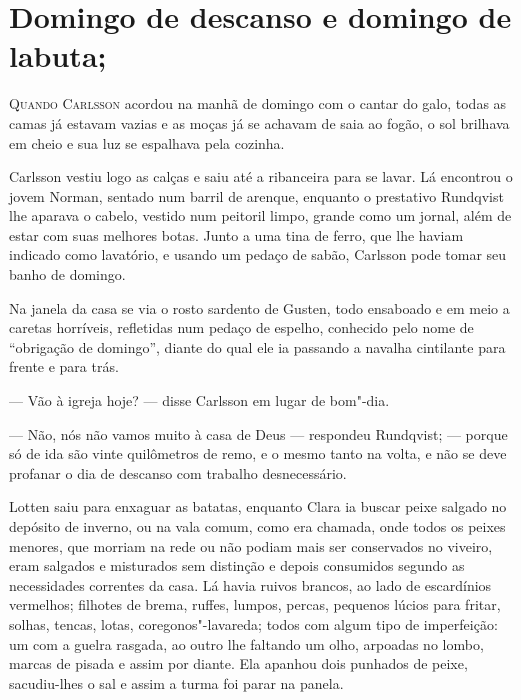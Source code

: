 
\chapter[Domingo de descanso e domingo de labuta\ldots]{Domingo de descanso e domingo de labuta;} 

\textsc{Quando Carlsson} acordou na manhã de domingo com o cantar do galo, todas
as camas já estavam vazias e as moças já se achavam de saia ao fogão, o sol
brilhava em cheio e sua luz se espalhava pela cozinha.

Carlsson vestiu logo as calças e saiu até a ribanceira para se lavar. Lá
encontrou o jovem Norman, sentado num barril de arenque, enquanto o prestativo
Rundqvist lhe aparava o cabelo, vestido num peitoril limpo, grande como um
jornal, além de estar com suas melhores botas. Junto a uma tina de ferro, que
lhe haviam indicado como lavatório, e usando um pedaço de sabão, Carlsson
pode tomar seu banho de domingo.

Na janela da casa se via o rosto sardento de Gusten, todo ensaboado e em meio a
caretas horríveis, refletidas num pedaço de espelho, conhecido pelo nome de
``obrigação de domingo'', diante do qual ele ia passando a navalha cintilante
para frente e para trás.

--- Vão à igreja hoje? --- disse Carlsson em lugar de bom"-dia.

--- Não, nós não vamos muito à casa de Deus --- respondeu Rundqvist; --- porque só
de ida são vinte quilômetros de remo, e o mesmo tanto na volta, e não se deve
profanar o dia de descanso com trabalho desnecessário.

Lotten saiu para enxaguar as batatas, enquanto Clara ia buscar peixe salgado
no depósito de inverno, ou na vala comum, como era chamada, onde todos
os peixes menores, que morriam na rede ou não podiam mais ser conservados no
viveiro, eram salgados e misturados sem distinção e depois consumidos segundo as
necessidades correntes da casa. Lá havia ruivos brancos, ao lado de escardínios
vermelhos; filhotes de brema, ruffes, lumpos, percas, pequenos lúcios para
fritar, solhas, tencas, lotas, coregonos"-lavareda; todos com algum tipo de
imperfeição: um com a guelra rasgada, ao outro lhe faltando um olho, arpoadas no
lombo, marcas de pisada e assim por diante. Ela apanhou dois punhados de peixe,
sacudiu-lhes o sal e assim a turma foi parar na panela.

